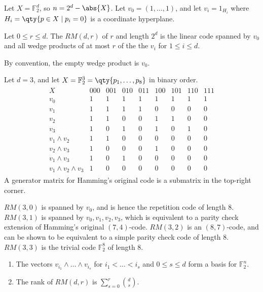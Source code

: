 Let $X = \mathbb F_2^d$, so $n = 2^d - \abs{X}$.
Let $v_0 = (1, \dots, 1)$, and let $v_i = 1_{H_i}$ where $H_i = \qty{p \in X \mid p_i = 0}$ is a coordinate hyperplane.
\begin{definition}
    Let $0 \leq r \leq d$.
    The  $RM(d,r)$ of  $r$ and length $2^d$ is the linear code spanned by $v_0$ and all wedge products of at most $r$ of the the $v_i$ for $1 \leq i \leq d$.
\end{definition}
By convention, the empty wedge product is $v_0$.
\begin{example}
    Let $d = 3$, and let $X = \mathbb F_2^3 = \qty{p_1, \dots, p_8}$ in binary order.
    \begin{align*}
        \begin{array}{c|cccccccc}
            X & 000 & 001 & 010 & 011 & 100 & 101 & 110 & 111 \\\hline
            v_0 & 1 & 1 & 1 & 1 & 1 & 1 & 1 & 1 \\
            v_1 & 1 & 1 & 1 & 1 & 0 & 0 & 0 & 0 \\
            v_2 & 1 & 1 & 0 & 0 & 1 & 1 & 0 & 0 \\
            v_3 & 1 & 0 & 1 & 0 & 1 & 0 & 1 & 0 \\
            v_1 \wedge v_2 & 1 & 1 & 0 & 0 & 0 & 0 & 0 & 0 \\
            v_2 \wedge v_3 & 1 & 0 & 0 & 0 & 1 & 0 & 0 & 0 \\
            v_1 \wedge v_3 & 1 & 0 & 1 & 0 & 0 & 0 & 0 & 0 \\
            v_1 \wedge v_2 \wedge v_3 & 1 & 0 & 0 & 0 & 0 & 0 & 0 & 0
        \end{array}
    \end{align*}
    A generator matrix for Hamming's original code is a submatrix in the top-right corner.
\end{example}
$RM(3,0)$ is spanned by $v_0$, and is hence the repetition code of length 8.
$RM(3,1)$ is spanned by $v_0, v_1, v_2, v_3$, which is equivalent to a parity check extension of Hamming's original $(7,4)$-code.
$RM(3,2)$ is an $(8,7)$-code, and can be shown to be equivalent to a simple parity check code of length 8.
$RM(3,3)$ is the trivial code $\mathbb F_2^8$ of length 8.
\begin{theorem}
    \begin{enumerate}
        \item The vectors $v_{i_1} \wedge \dots \wedge v_{i_s}$ for $i_1 < \dots < i_s$ and $0 \leq s \leq d$ form a basis for $\mathbb F_2^n$.
        \item The rank of $RM(d,r)$ is $\sum_{s=0}^r \binom{d}{s}$.
    \end{enumerate}
\end{theorem}
